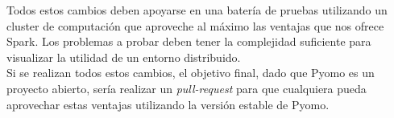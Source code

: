 Todos estos cambios deben apoyarse en una batería de pruebas utilizando un cluster de computación que aproveche al máximo las ventajas que nos ofrece Spark. Los problemas a probar deben tener la complejidad suficiente para visualizar la utilidad de un entorno distribuido.\\

Si se realizan todos estos cambios, el objetivo final, dado que Pyomo es un proyecto abierto, sería realizar un \textit{pull-request} para que cualquiera pueda aprovechar estas ventajas utilizando la versión estable de Pyomo.